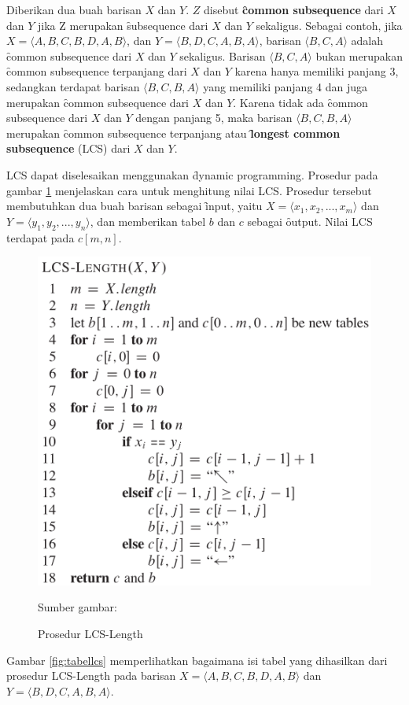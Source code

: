 Diberikan dua buah barisan $X$ dan $Y$. $Z$ disebut \textbf{\f{common subsequence}} dari $X$ dan $Y$ jika Z merupakan \f{subsequence} dari $X$ dan $Y$ sekaligus. Sebagai contoh,  jika $X=\langle A,B,C,B,D,A,B\rangle$, dan $Y=\langle B,D,C,A,B,A\rangle$, barisan $\langle B,C,A\rangle$ adalah \f{common subsequence} dari $X$ dan $Y$ sekaligus. Barisan $\langle B,C,A\rangle$ bukan merupakan \f{common subsequence} terpanjang dari $X$ dan $Y$ karena hanya memiliki panjang 3, sedangkan terdapat barisan $\langle B,C,B,A\rangle$ yang memiliki panjang 4 dan juga merupakan \f{common subsequence} dari $X$ dan $Y$. Karena tidak ada \f{common subsequence} dari $X$ dan $Y$ dengan panjang 5, maka barisan $\langle B,C,B,A\rangle$ merupakan \f{common subsequence} terpanjang atau \textbf{\f{longest common subsequence}} (LCS) dari $X$ dan $Y$.

LCS dapat diselesaikan menggunakan \f{dynamic programming}. Prosedur pada gambar \ref{fig:prosedurlcs} menjelaskan cara untuk menghitung nilai LCS. Prosedur tersebut membutuhkan dua buah barisan sebagai \f{input}, yaitu $X=\langle x_1,x_2,...,x_m\rangle$ dan $Y=\langle y_1,y_2,...,y_n\rangle$, dan memberikan tabel $b$ dan $c$ sebagai \f{output}. Nilai LCS terdapat pada $c[m,n]$.

\begin{figure}
  \centering
  \includegraphics[width=0.7\linewidth]{pics/prosedur_lcs}
  \caption{Prosedur LCS-Length}{Sumber gambar: \cite{Cormen:2009:IAT:1614191}}
  \label{fig:prosedurlcs}
\end{figure}

Gambar \ref{fig:tabellcs} memperlihatkan bagaimana isi tabel yang dihasilkan dari prosedur LCS-Length pada barisan $X=\langle A,B,C,B,D,A,B\rangle$ dan $Y=\langle B,D,C,A,B,A\rangle$.

